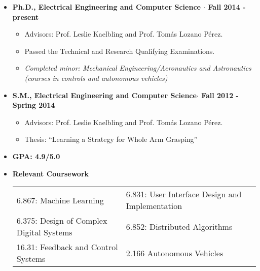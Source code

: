 \documentclass[10pt,letterpaper]{article}
\begin{document}
 \begin{itemize}
 	\item {\bf Ph.D., Electrical Engineering and Computer Science $\cdot$ Fall 2014 - present}
 	 \begin{itemize}
	\item Advisors: Prof. Leslie Kaelbling and Prof. Tom\'as Lozano P\'erez.
	\item Passed the Technical and Research Qualifying Examinations.
	\item {\em Completed minor: Mechanical Engineering/Aeronautics and Astronautics  (courses in controls and autonomous vehicles)}
	\end{itemize}
 \end{itemize}
 \begin{itemize}
 	\item {\bf S.M., Electrical Engineering and Computer Science$\cdot$ Fall 2012 - Spring 2014}
 	\begin{itemize}
	\item Advisors: Prof. Leslie Kaelbling and Prof. Tom\'as Lozano P\'erez.
	\item Thesis: ``Learning a Strategy for Whole Arm Grasping''
	\end{itemize}
	\item {\bf GPA:  4.9/5.0 }
	\item {\bf Relevant Coursework}\\
        \begin{tabularx}{\textwidth}{l l}
      6.867: Machine Learning 
      & \hfill 6.831: User Interface Design and Implementation\\
      6.375: Design of Complex Digital Systems
      & \hfill 6.852: Distributed Algorithms\\
      16.31: Feedback and Control Systems
      & \hfill 2.166 Autonomous Vehicles\\
     \end{tabularx}
\end{itemize}
\end{document}
